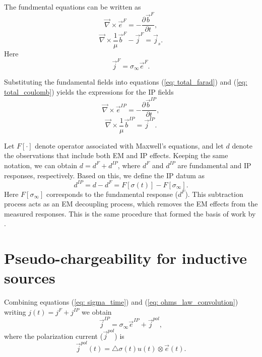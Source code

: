 \documentclass[a4paper, 11pt]{article}
\newcommand{\curl}{{\vec \nabla}\times}
\newcommand{\siginf}{\sigma_\infty}
\newcommand{\dsig}{\triangle\sigma}
\renewcommand {\j}  { {\vec j} }
\renewcommand {\b}  { {\vec b} }
\newcommand {\e}  { {\vec e} }
\newcommand{\dip}{d^{IP}}
\begin{document}
The fundmental equations can be written as
\begin{equation}
  \curl \e^{F} = -\frac{\partial \b^{F}}{\partial t},
  \label{eq: eq_primary_farad}
\end{equation}
\begin{equation}
  \curl{\frac{1}{\mu}\b^{F}} -\j^{F} = \j_s.
  \label{eq: eq_primary_coulomb}
\end{equation}
Here
\begin{equation}
  \j^{F} = \siginf\e^{F}.
  \label{eq: jF}
\end{equation}

Substituting the fundamental fields into equations (\ref{eq: total_farad}) and (\ref{eq: total_coulomb}) yields the expressions for the IP fields 
\begin{equation}
  \curl \e^{IP} = -\frac{\partial \b^{IP}}{\partial t},
  \label{eq: eq_secondary_farad}
\end{equation}
\begin{equation}
  \curl{\frac{1}{\mu}\b^{IP}} = \j^{IP}.
  \label{eq: eq_secondary_coulomb}
\end{equation}

Let $F[\cdot]$ denote operator associated with Maxwell’s equations, and let $d$ denote the observations that include both EM and IP effects. 
Keeping the same notation, we can obtain $d = d^{F} + \dip$, where $d^F$ and $\dip$ are fundamental and IP responses, respectively. 
Based on this, we define the IP datum as 
\begin{equation}
  \dip = d - d^{F} = F[\sigma(t)]-F[\siginf].
    \label{eq: IPdatum_syn}
\end{equation}
Here $F[\siginf]$ corresponds to the fundamental response ($d^F$). 
This subtraction process acts as an EM decoupling process, which removes the EM effects from the measured responses. This is the same procedure that formed the basis of work by \cite{routh2001}. 

\section{Pseudo-chargeability for inductive sources}
Combining equations (\ref{eq: sigma_time}) and  (\ref{eq: ohms_law_convolution}) writing $j(t)=j^F + j^{IP}$ we obtain
\begin{equation}
  \j^{IP} = \siginf \e^{IP} + \j^{pol},
  \label{eq:IP_current}
\end{equation}
where the polarization current ($\j^{pol}$) is
\begin{equation}
  \j^{pol}(t) = \dsig(t)u(t) \otimes \e(t).
  \label{eq:polarization_current}
\end{equation}
\end{document}
